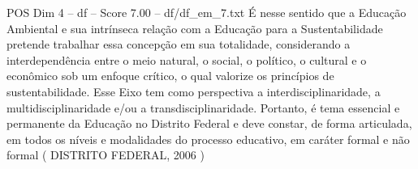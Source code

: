 \begin{textsample}{POS Dim 4 – df – Score 7.00 – df/df\_em\_7.txt}
É nesse sentido que a Educação Ambiental e sua intrínseca relação com a Educação para a Sustentabilidade pretende trabalhar essa concepção em sua totalidade, considerando a interdependência entre o meio natural, o social, o político, o cultural e o econômico sob um enfoque crítico, o qual valorize os princípios de sustentabilidade.
Esse Eixo tem como perspectiva a interdisciplinaridade, a multidisciplinaridade e/ou a transdisciplinaridade.
Portanto, é tema essencial e permanente da Educação no Distrito Federal e deve constar, de forma articulada, em todos os níveis e modalidades do processo educativo, em caráter formal e não formal ( DISTRITO FEDERAL, 2006 )

\end{textsample}
